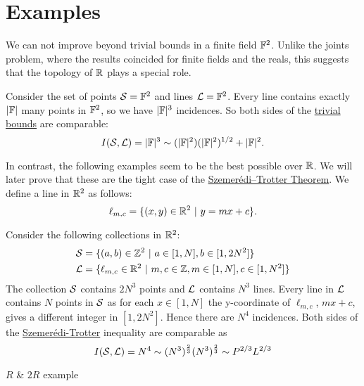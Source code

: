 \section{Examples}
We can not improve beyond trivial bounds in a finite field $\mathbb F^2$. Unlike the joints problem, where the results coincided for finite fields and the reals,
this suggests that the topology of $\mathbb R$ plays a special role. 
\begin{example}
Consider the set of points $\mathcal S=\mathbb F^2$ and lines 
$\mathcal L = \mathbb F^2$. Every line contains exactly $|\mathbb F|$ many points in $\mathbb F^2$, so we have $|\mathbb F|^3$ incidences. 
So both sides of the \hyperref[thm:trivial-ST-bounds]{trivial bounds} are comparable:
$$
I(\mathcal S,\mathcal L) = |\mathbb F|^3 \sim (|\mathbb F|^2)(|\mathbb F|^2)^{1/2} + |\mathbb F|^2.
$$
\end{example}
In contrast, the following examples seem to be the best possible over $\mathbb R$. We will later prove that these are the tight case of the \hyperref[thm:S-T]{Szemerédi–Trotter Theorem}.
We define a line in $\mathbb R^2$ as follows:
\[
    \ell_{m,c} = \{(x,y) \in \mathbb R^2 \ | \ y = mx+c\}.     
\]
\begin{example}
    Consider the following collections in $\mathbb R^2$:
    \begin{align*}
    \mathcal S &= \{ (a,b) \in \mathbb Z^2 \ | \ a\in [1,N], b \in [1,2N^2] \} \\
    \mathcal L &= \{ \ell_{m,c} \in \mathbb R^2 \ | \ m,c\in \mathbb Z, m\in [1,N], c \in [1,N^2] \} \end{align*}
    The collection $\mathcal S$ contains $2N^3$ points and $\mathcal L$ contains $N^3$ lines. Every line in $\mathcal L$ contains $N$ points in $\mathcal S$ as for each $x \in [1,N]$  the y-coordinate of $\ell_{m,c}$, $ mx+c$, gives a different integer in $[1,2N^2]$.
    Hence there are $N^4$ incidences. Both sides of the \hyperref[thm:S-T]{Szemerédi-Trotter} inequality are comparable as 
    $$ I(\mathcal S,\mathcal L) = N^4 \sim (N^3)^{\frac{2}{3}} (N^3)^{\frac{2}{3}} \sim P^{2/3} L^{2/3}$$
\end{example}
\begin{example}
    $R$ \& $2R$ example
\end{example}



